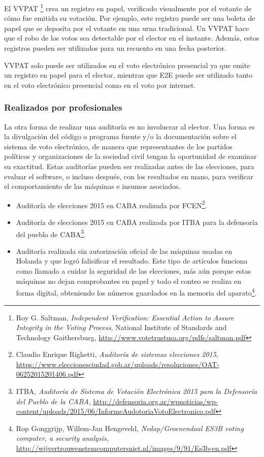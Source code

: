 \documentclass[a4,11pt]{article}
\begin{document}
El VVPAT \footnote{Roy G. Saltman, \textit{Independent Verification: Essential Action to Assure Integrity in the Voting Process}, National Institute of Standards and Technology Gaithersburg, \url{http://www.votetrustusa.org/pdfs/saltman.pdf}} crea un registro en papel, verificado visualmente por el votante de cómo fue emitida su votación. Por ejemplo, este registro puede ser una boleta de papel que se deposita por el votante en una urna tradicional. Un VVPAT hace que el robo de los votos sea detectable por el elector en el instante. Además, estos registros pueden ser utilizados para un recuento en una fecha posterior.

VVPAT solo puede ser utilizados en el voto electrónico presencial ya que emite un registro en papel para el elector, mientras que E2E puede ser utilizado tanto en el voto electrónico presencial como en el voto por internet.

\subsubsection{Realizados por profesionales}
La otra forma de realizar una auditoría es no involucrar al elector. Una forma es la divulgación del código o programa fuente y/o la documentación sobre el sistema de voto electrónico, de manera que representantes de los partidos políticos y organizaciones de la sociedad civil tengan la oportunidad de examinar su exactitud. Estas auditorías pueden ser realizadas antes de las elecciones, para evaluar el software, o incluso después, con los resultados en mano, para verificar el comportamiento de las máquinas e insumos asociados.
\begin{itemize}
\item Auditoría de elecciones 2015 en CABA realizada por FCEN\footnote{Claudio Enrique Righetti, \textit{Auditoría de sistemas elecciones 2015}, \url{https://www.eleccionesciudad.gob.ar/uploads/resoluciones/OAT-06252015201406.pdf}}.
\item Auditoría de elecciones 2015 en CABA realizada por ITBA para la defensoría del pueblo de CABA\footnote{ITBA, \textit{Auditoría de Sistema de Votación Electrónica 2015 para la Defensoría del Pueblo de la CABA}, \url{http://defensoria.org.ar/wpnoticias/wp-content/uploads/2015/06/InformeAudotoriaVotoElectronico.pdf}}.
\item Auditoría realizada sin autorización oficial de las máquinas usadas en Holanda y que logró falisificar el resultado. Este tipo de artículos funciona como llamado a cuidar la seguridad de las elecciones, más aún porque estas máquinas no dejan comprobantes en papel y todo el conteo se realiza en forma digital, obteniendo los números guardados en la memoria del aparato\footnote{Rop Gonggrijp, Willem-Jan Hengeveld, \textit{Nedap/Groenendaal ES3B voting computer, a security analysis}, \url{http://wijvertrouwenstemcomputersniet.nl/images/9/91/Es3b-en.pdf}}.
\end{itemize}
\end{document}
